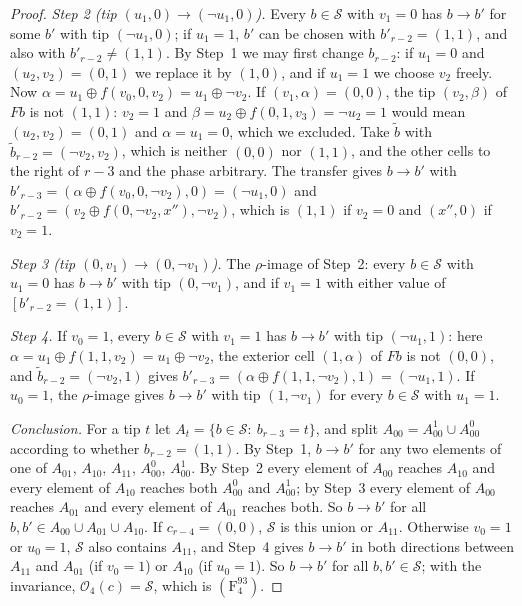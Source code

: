 \begin{proof}
\emph{Step 2 (tip $(u_1,0)\to(\neg u_1,0)$).} Every $b\in\mathcal S$ with $v_1=0$ has $b\to b'$ for some $b'$ with tip $(\neg u_1,0)$; if $u_1=1$, $b'$ can be chosen with $b'_{r-2}=(1,1)$, and also with $b'_{r-2}\ne(1,1)$. By Step~1 we may first change $b_{r-2}$: if $u_1=0$ and $(u_2,v_2)=(0,1)$ we replace it by $(1,0)$, and if $u_1=1$ we choose $v_2$ freely. Now $\alpha=u_1\oplus f(v_0,0,v_2)=u_1\oplus\neg v_2$. If $(v_1,\alpha)=(0,0)$, the tip $(v_2,\beta)$ of $Fb$ is not $(1,1)$: $v_2=1$ and $\beta=u_2\oplus f(0,1,v_3)=\neg u_2=1$ would mean $(u_2,v_2)=(0,1)$ and $\alpha=u_1=0$, which we excluded. Take $\tilde b$ with $\tilde b_{r-2}=(\neg v_2,v_2)$, which is neither $(0,0)$ nor $(1,1)$, and the other cells to the right of $r-3$ and the phase arbitrary. The transfer gives $b\to b'$ with $b'_{r-3}=(\alpha\oplus f(v_0,0,\neg v_2),0)=(\neg u_1,0)$ and $b'_{r-2}=(v_2\oplus f(0,\neg v_2,x''),\neg v_2)$, which is $(1,1)$ if $v_2=0$ and $(x'',0)$ if $v_2=1$.

\emph{Step 3 (tip $(0,v_1)\to(0,\neg v_1)$).} The $\rho$-image of Step~2: every $b\in\mathcal S$ with $u_1=0$ has $b\to b'$ with tip $(0,\neg v_1)$, and if $v_1=1$ with either value of $[b'_{r-2}=(1,1)]$.

\emph{Step 4.} If $v_0=1$, every $b\in\mathcal S$ with $v_1=1$ has $b\to b'$ with tip $(\neg u_1,1)$: here $\alpha=u_1\oplus f(1,1,v_2)=u_1\oplus\neg v_2$, the exterior cell $(1,\alpha)$ of $Fb$ is not $(0,0)$, and $\tilde b_{r-2}=(\neg v_2,1)$ gives $b'_{r-3}=(\alpha\oplus f(1,1,\neg v_2),1)=(\neg u_1,1)$. If $u_0=1$, the $\rho$-image gives $b\to b'$ with tip $(1,\neg v_1)$ for every $b\in\mathcal S$ with $u_1=1$.

\emph{Conclusion.} For a tip $t$ let $A_t=\{b\in\mathcal S:\ b_{r-3}=t\}$, and split $A_{00}=A^1_{00}\cup A^0_{00}$ according to whether $b_{r-2}=(1,1)$. By Step~1, $b\to b'$ for any two elements of one of $A_{01}$, $A_{10}$, $A_{11}$, $A^0_{00}$, $A^1_{00}$. By Step~2 every element of $A_{00}$ reaches $A_{10}$ and every element of $A_{10}$ reaches both $A^0_{00}$ and $A^1_{00}$; by Step~3 every element of $A_{00}$ reaches $A_{01}$ and every element of $A_{01}$ reaches both. So $b\to b'$ for all $b,b'\in A_{00}\cup A_{01}\cup A_{10}$. If $c_{r-4}=(0,0)$, $\mathcal S$ is this union or $A_{11}$. Otherwise $v_0=1$ or $u_0=1$, $\mathcal S$ also contains $A_{11}$, and Step~4 gives $b\to b'$ in both directions between $A_{11}$ and $A_{01}$ (if $v_0=1$) or $A_{10}$ (if $u_0=1$). So $b\to b'$ for all $b,b'\in\mathcal S$; with the invariance, $\mathcal O_4(c)=\mathcal S$, which is $(\mathrm F^{93}_4)$.


\end{proof}
